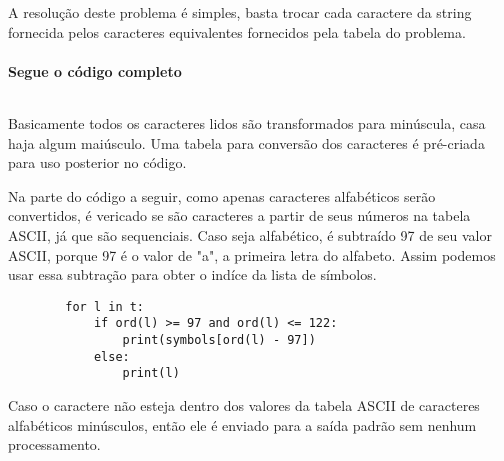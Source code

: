 A resolução deste problema é simples, basta trocar cada caractere da string fornecida pelos caracteres equivalentes fornecidos pela tabela do problema.

\paragraph{Segue o código completo}
\begin{mdframed}[linewidth=0pt,backgroundcolor=codebgcolor]
    \inputminted[breaklines]{python}{../src/anewalphabet/anewalphabet.py}
\end{mdframed}

\par Basicamente todos os caracteres lidos são transformados para minúscula, casa haja algum maiúsculo.
Uma tabela para conversão dos caracteres é pré-criada para uso posterior no código.
\par Na parte do código a seguir, como apenas caracteres alfabéticos serão convertidos, é vericado se são caracteres a partir de seus números na tabela ASCII, já que são sequenciais. Caso seja alfabético, é subtraído 97 de seu valor ASCII, porque 97 é o valor de "a", a primeira letra do alfabeto. Assim podemos usar essa subtração para obter o indíce da lista de símbolos.

\begin{mdframed}[linewidth=0pt,backgroundcolor=codebgcolor]
    \begin{verbatim}
        for l in t:
            if ord(l) >= 97 and ord(l) <= 122:
                print(symbols[ord(l) - 97])
            else:
                print(l)
    \end{verbatim}
\end{mdframed}
\par Caso o caractere não esteja dentro dos valores da tabela ASCII de caracteres alfabéticos minúsculos, então ele é enviado para a saída padrão sem nenhum processamento.
